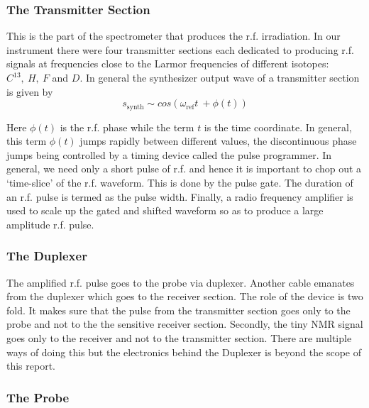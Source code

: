 		\subsubsection{The Transmitter Section}

		This is the part of the spectrometer that produces the r.f. irradiation.
		In our instrument there were four transmitter sections each dedicated
		to producing r.f. signals at frequencies close to the Larmor frequencies
		of different isotopes: $C^{13},\ H,\ F$ and $D.$ In general the
		synthesizer output wave of a transmitter section is given by 
		\begin{equation}
		s_\text{synth}\sim cos(\omega_\text{ref}t\ +\phi(t))
		\end{equation}


		Here $\phi(t)$ is the r.f. phase while the term $t$ is the time
		coordinate. In general, this term $\phi(t)$ jumps rapidly between
		different values, the discontinuous phase jumps being controlled by
		a timing device called the pulse programmer. In general, we need only
		a short pulse of r.f. and hence it is important to chop out a `time-slice'
		of the r.f. waveform. This is done by the pulse gate. The duration
		of an r.f. pulse is termed as the pulse width. Finally, a radio frequency
		amplifier is used to scale up the gated and shifted waveform so as
		to produce a large amplitude r.f. pulse. 


		\subsubsection{The Duplexer}

		The amplified r.f. pulse goes to the probe via duplexer. Another cable
		emanates from the duplexer which goes to the receiver section. The
		role of the device is two fold. It makes sure that the pulse from
		the transmitter section goes only to the probe and not to the the
		sensitive receiver section. Secondly, the tiny NMR signal goes only
		to the receiver and not to the transmitter section. There are multiple
		ways of doing this but the electronics behind the Duplexer is beyond
		the scope of this report. 


		\subsubsection{The Probe}

